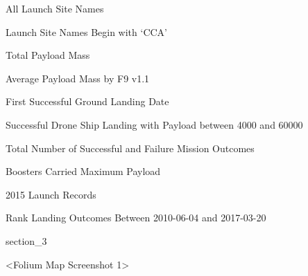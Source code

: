 \begin{frame}{All Launch Site Names}

\end{frame}

\begin{frame}{Launch Site Names Begin with `CCA'}

\end{frame}

\begin{frame}{Total Payload Mass}

\end{frame}

\begin{frame}{Average Payload Mass by F9 v1.1}

\end{frame}

\begin{frame}{First Successful Ground Landing Date}

\end{frame}

\begin{frame}{Successful Drone Ship Landing with Payload between 4000 and 60000}

\end{frame}

\begin{frame}{Total Number of Successful and Failure Mission Outcomes}

\end{frame}

\begin{frame}{Boosters Carried Maximum Payload}

\end{frame}

\begin{frame}{2015 Launch Records}

\end{frame}

\begin{frame}{Rank Landing Outcomes Between 2010-06-04 and 2017-03-20}

\end{frame}

{
{section_3}
\begin{frame}[plain]
\end{frame}
}

\begin{frame}{<Folium Map Screenshot 1>}

\end{frame}


